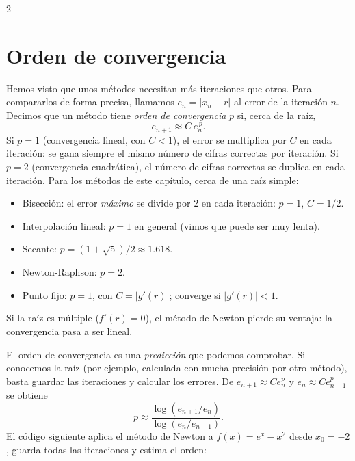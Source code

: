 \begin{paracol}{2}
\section[Orden de convergencia]{Orden de convergencia}\label{sec:orden}
Hemos visto que unos métodos necesitan más iteraciones que otros. Para compararlos de forma precisa, llamamos $e_n=\vert x_n-r\vert$ al error de la iteración $n$. Decimos que un método tiene \emph{orden de convergencia} $p$ si, cerca de la raíz,
\begin{equation*}
e_{n+1}\approx C\,e_n^{\,p}.
\end{equation*}
Si $p=1$ (convergencia lineal, con $C<1$), el error se multiplica por $C$ en cada iteración: se gana siempre el mismo número de cifras correctas por iteración. Si $p=2$ (convergencia cuadrática), el número de cifras correctas se duplica en cada iteración. Para los métodos de este capítulo, cerca de una raíz simple:
\begin{itemize}
\item Bisección: el error \emph{máximo} se divide por 2 en cada iteración: $p=1$, $C=1/2$.
\item Interpolación lineal: $p=1$ en general (vimos que puede ser muy lenta).
\item Secante: $p=(1+\sqrt5)/2\approx1.618$.
\item Newton-Raphson: $p=2$.
\item Punto fijo: $p=1$, con $C=\vert g'(r)\vert$; converge si $\vert g'(r)\vert<1$.
\end{itemize}
Si la raíz es múltiple ($f'(r)=0$), el método de Newton pierde su ventaja: la convergencia pasa a ser lineal.

El orden de convergencia es una \emph{predicción} que podemos comprobar. Si conocemos la raíz (por ejemplo, calculada con mucha precisión por otro método), basta guardar las iteraciones y calcular los errores. De $e_{n+1}\approx Ce_n^p$ y $e_n\approx Ce_{n-1}^p$ se obtiene
\begin{equation*}
p\approx\frac{\log(e_{n+1}/e_n)}{\log(e_n/e_{n-1})}.
\end{equation*}
El código siguiente aplica el método de Newton a $f(x)=e^x-x^2$ desde $x_0=-2$, guarda todas las iteraciones y estima el orden:
\switchcolumn

\end{paracol}
